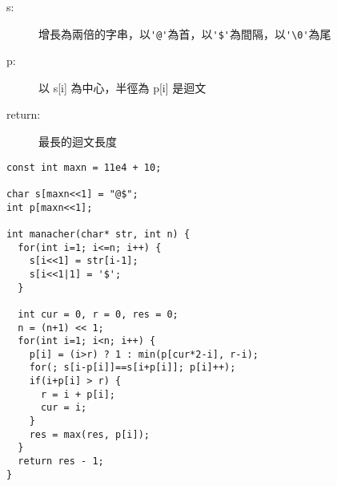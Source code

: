 \begin{description}
    \item [s:] 增長為兩倍的字串，以\verb|'@'|為首，以\verb|'$'|為間隔，以\verb|'\0'|為尾
    \item [p:] 以 s[i] 為中心，半徑為 p[i] 是迴文
    \item [return:] 最長的迴文長度
\end{description}

\begin{lstlisting}
const int maxn = 11e4 + 10;

char s[maxn<<1] = "@$";
int p[maxn<<1];

int manacher(char* str, int n) {
  for(int i=1; i<=n; i++) {
    s[i<<1] = str[i-1];
    s[i<<1|1] = '$';
  }

  int cur = 0, r = 0, res = 0;
  n = (n+1) << 1;
  for(int i=1; i<n; i++) {
    p[i] = (i>r) ? 1 : min(p[cur*2-i], r-i);
    for(; s[i-p[i]]==s[i+p[i]]; p[i]++);
    if(i+p[i] > r) {
      r = i + p[i];
      cur = i;
    }
    res = max(res, p[i]);
  }
  return res - 1;
}
\end{lstlisting}